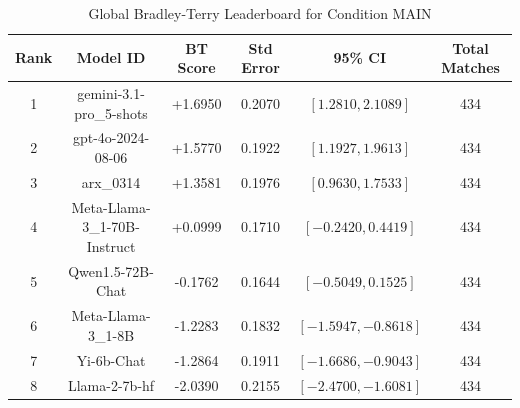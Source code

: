 \begin{table}[ht]
\centering
\caption{Global Bradley-Terry Leaderboard for Condition \textsc{MAIN}}
\label{tab:leaderboard_main}
\begin{tabular}{cccccc}
\hline
\textbf{Rank} & \textbf{Model ID} & \textbf{BT Score} & \textbf{Std Error} & \textbf{95\% CI} & \textbf{Total Matches} \\
\hline
1 & gemini-3.1-pro\_5-shots & +1.6950 & 0.2070 & $[1.2810, 2.1089]$ & 434 \\
2 & gpt-4o-2024-08-06 & +1.5770 & 0.1922 & $[1.1927, 1.9613]$ & 434 \\
3 & arx\_0314 & +1.3581 & 0.1976 & $[0.9630, 1.7533]$ & 434 \\
4 & Meta-Llama-3\_1-70B-Instruct & +0.0999 & 0.1710 & $[-0.2420, 0.4419]$ & 434 \\
5 & Qwen1.5-72B-Chat & -0.1762 & 0.1644 & $[-0.5049, 0.1525]$ & 434 \\
6 & Meta-Llama-3\_1-8B & -1.2283 & 0.1832 & $[-1.5947, -0.8618]$ & 434 \\
7 & Yi-6b-Chat & -1.2864 & 0.1911 & $[-1.6686, -0.9043]$ & 434 \\
8 & Llama-2-7b-hf & -2.0390 & 0.2155 & $[-2.4700, -1.6081]$ & 434 \\
\hline
\end{tabular}
\end{table}
